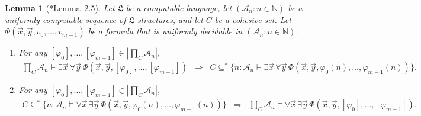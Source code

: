 \documentclass[11pt,a4paper,reqno]{amsart}
\newtheorem{Lemma}[Theorem]{Lemma}
\theoremstyle{definition}
\newcommand{\Imp}{\Rightarrow}
\newcommand{\Nb}{\mathbb{N}}
\newcommand{\mc}[1]{\mathcal{#1}}
\newcommand{\mf}[1]{\mathfrak{#1}}
\begin{document}
\begin{Lemma}[\cite{CohPowJournal}*{Lemma~2.5}]\label{lem-LosProdParamHelper}
Let $\mf{L}$ be a computable language, let $(\mc{A}_n : n \in \Nb)$ be a uniformly computable sequence of $\mf{L}$-structures, and let $C$ be a cohesive set.  Let $\Phi(\vec{x}, \vec{y}, v_0, \dots, v_{m-1})$ be a formula that is uniformly decidable in $(\mc{A}_n : n \in \Nb)$.

\begin{enumerate}[(1)]
\item\label{it-LosProdPramSig2Helper} For any $[\varphi_0], \dots, [\varphi_{m-1}] \in |\prod_C \mc{A}_n|$,
\begin{align*}
\prod\nolimits_C \mc{A}_n \models \exists \vec{x}\, \forall \vec{y}\, \Phi(\vec{x}, \vec{y}, [\varphi_0], \dots, [\varphi_{m-1}]) \;\;\Imp\;\; C \subseteq^* \bigl\{n : \mc{A}_n \models \exists \vec{x}\, \forall \vec{y}\, \Phi(\vec{x}, \vec{y}, \varphi_0(n), \dots, \varphi_{m-1}(n))\bigr\}.
\end{align*}

\medskip

\item\label{it-LosProdPramPi2Helper} For any $[\varphi_0], \dots, [\varphi_{m-1}] \in |\prod_C \mc{A}_n|$,
\begin{align*}
C \subseteq^* \bigl\{n : \mc{A}_n \models \forall \vec{x}\, \exists \vec{y}\, \Phi(\vec{x}, \vec{y}, \varphi_0(n), \dots, \varphi_{m-1}(n))\bigr\} \;\;\Imp\;\; \prod\nolimits_C \mc{A}_n \models \forall \vec{x}\, \exists \vec{y}\, \Phi(\vec{x}, \vec{y}, [\varphi_0], \dots, [\varphi_{m-1}]).
\end{align*}
\end{enumerate}
\end{Lemma}
\end{document}
